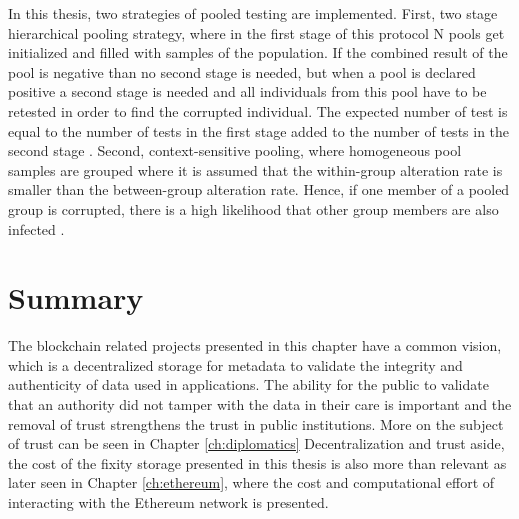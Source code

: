 In this thesis, two strategies of pooled testing are implemented. 
First, two stage hierarchical pooling strategy, where in the first stage of this protocol N pools get initialized and filled with samples of the population. If the combined result of the pool is negative than no second stage is needed, but when a pool is declared positive a second stage is needed and all individuals from this pool have to be retested in order to find the corrupted individual. The expected number of test is equal to the number of tests in the first stage added to the number of tests in the second stage \cite[3]{nianogo2021optimal}.
Second, context-sensitive pooling, where homogeneous pool samples are grouped where it is assumed that the within-group alteration rate is smaller than the between-group alteration rate. Hence, if one member of a pooled group is corrupted, there is a high likelihood that other group members are also infected \cite[3]{deckert2020simulation}.

\section{Summary}
The blockchain related projects presented in this chapter have a common vision, which is a decentralized storage for metadata to validate the integrity and authenticity of data used in applications. The ability for the public to validate that an authority did not tamper with the data in their care is important and the removal of trust strengthens the trust in public institutions. More on the subject of trust can be seen in Chapter \ref{ch:diplomatics}
Decentralization and trust aside, the cost of the fixity storage presented in this thesis is also more than relevant as later seen in Chapter \ref{ch:ethereum}, where the cost and computational effort of interacting with the Ethereum network is presented.
